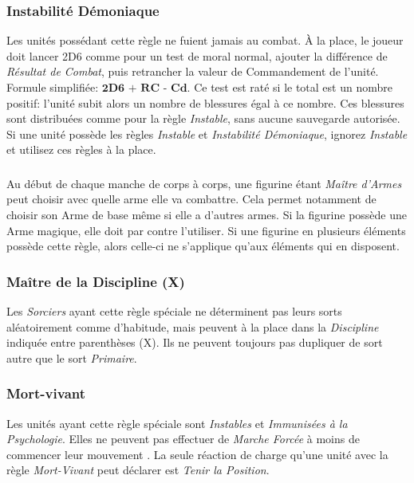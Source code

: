 \subsubsection*{Instabilité Démoniaque}

Les unités possédant cette règle ne fuient jamais au combat. À la place, le joueur doit lancer 2D6 comme pour un test de moral normal, ajouter la différence de \emph{Résultat de Combat}, puis retrancher la valeur de Commandement de l'unité. Formule simplifiée: $\textbf{2D6 + RC - Cd}$. Ce test est raté si le total est un nombre positif: l'unité subit alors un nombre de blessures égal à ce nombre. Ces blessures sont distribuées comme pour la règle \emph{Instable}, sans aucune sauvegarde autorisée. Si une unité possède les règles \emph{Instable} et \emph{Instabilité Démoniaque}, ignorez \emph{Instable} et utilisez ces règles à la place.

\subsubsection*{}

Au début de chaque manche de corps à corps, une figurine étant \emph{Maître d'Armes} peut choisir avec quelle arme elle va combattre. Cela permet notamment de choisir son Arme de base même si elle a d'autres armes. Si la figurine possède une Arme magique, elle doit par contre l'utiliser. Si une figurine en plusieurs éléments possède cette règle, alors celle-ci ne s'applique qu'aux éléments qui en disposent.

\subsubsection*{Maître de la Discipline (X)}

Les \emph{Sorciers} ayant cette règle spéciale ne déterminent pas leurs sorts aléatoirement comme d'habitude, mais peuvent à la place  dans la \emph{Discipline} indiquée entre parenthèses (X). Ils ne peuvent toujours pas dupliquer de sort autre que le sort \emph{Primaire}.

\subsubsection*{Mort-vivant}

Les unités ayant cette règle spéciale sont \emph{Instables} et \emph{Immunisées à la Psychologie}. Elles ne peuvent pas effectuer de \emph{Marche Forcée} à moins de commencer leur mouvement . La seule réaction de charge qu'une unité avec la règle \emph{Mort-Vivant} peut déclarer est \emph{Tenir la Position}.

